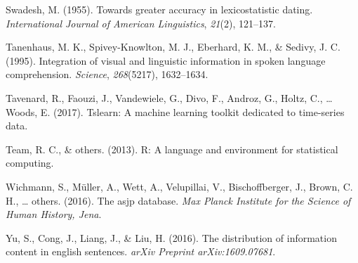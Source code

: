 \documentclass[
  english,
  man,floatsintext]{apa6}
\newlength{\cslhangindent}
\newenvironment{cslreferences}%
  {\setlength{\parindent}{0pt}%
  \everypar{\setlength{\hangindent}{\cslhangindent}}\ignorespaces}%
  {\par}
\begin{document}
\begin{cslreferences}
\leavevmode\hypertarget{ref-swadesh1955}{}%
Swadesh, M. (1955). Towards greater accuracy in lexicostatistic dating. \emph{International Journal of American Linguistics}, \emph{21}(2), 121--137.

\leavevmode\hypertarget{ref-tanenhaus1995}{}%
Tanenhaus, M. K., Spivey-Knowlton, M. J., Eberhard, K. M., \& Sedivy, J. C. (1995). Integration of visual and linguistic information in spoken language comprehension. \emph{Science}, \emph{268}(5217), 1632--1634.

\leavevmode\hypertarget{ref-tslearn}{}%
Tavenard, R., Faouzi, J., Vandewiele, G., Divo, F., Androz, G., Holtz, C., \ldots{} Woods, E. (2017). Tslearn: A machine learning toolkit dedicated to time-series data.

\leavevmode\hypertarget{ref-team2013}{}%
Team, R. C., \& others. (2013). R: A language and environment for statistical computing.

\leavevmode\hypertarget{ref-wichmann2016}{}%
Wichmann, S., Müller, A., Wett, A., Velupillai, V., Bischoffberger, J., Brown, C. H., \ldots{} others. (2016). The asjp database. \emph{Max Planck Institute for the Science of Human History, Jena}.

\leavevmode\hypertarget{ref-yu2016}{}%
Yu, S., Cong, J., Liang, J., \& Liu, H. (2016). The distribution of information content in english sentences. \emph{arXiv Preprint arXiv:1609.07681}.
\end{cslreferences}

\endgroup
\end{document}
